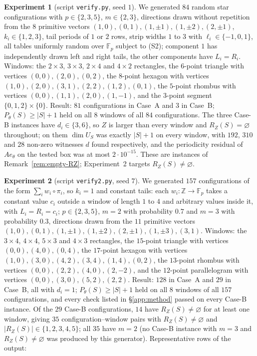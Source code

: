 \documentclass[11pt,reqno]{amsart}
\theoremstyle{plain}
\theoremstyle{definition}
\theoremstyle{remark}
\theoremstyle{plain}
\theoremstyle{remark}
\theoremstyle{definition}
\numberwithin{equation}{section}
\newcommand{\Z}{\mathbb{Z}}
\begin{document}
\noindent\textbf{Experiment 1} (script \texttt{verify.py}, seed $1$).  We
generated $84$ random star configurations with $p\in\{2,3,5\}$, $m\in\{2,3\}$,
directions drawn without
repetition from the $8$ primitive vectors
$(1,0),(0,1),(1,\pm1),(1,\pm2),(2,\pm1)$, $k_i\in\{1,2,3\}$, tail periods of
$1$ or $2$ rows, strip widths $1$ to $3$ with $\ell_i\in\{-1,0,1\}$, all
tables uniformly random over $\mathbb F_p$ subject to \textup{(S2)}; component
$1$ has independently drawn left and right tails, the other components have
$L_i=R_i$.  Windows: the $2\times3$, $3\times3$, $2\times4$ and $4\times2$
rectangles, the $6$-point triangle with vertices $(0,0),(2,0),(0,2)$, the
$8$-point hexagon with vertices $(1,0),(2,0),(3,1),(2,2),(1,2),(0,1)$, the
$5$-point rhombus with vertices $(0,0),(1,1),(2,0),(1,-1)$, and the $3$-point
segment $\{0,1,2\}\times\{0\}$.  Result: $81$ configurations in Case~A and
$3$ in Case~B; $P_\theta(S)\ge|S|+1$ held on all $8$ windows of all $84$
configurations.  The three Case-B instances have $d_i\in\{3,6\}$, so $Z$ is
larger than every window and $R_Z(S)=\varnothing$ throughout; on them
$\dim U_S$ was exactly $|S|+1$ on every window, with $192$, $310$ and $28$
non-zero witnesses $d$ found respectively, and the periodicity residual of
$Ae_\theta$ on the tested box was at most $2\cdot10^{-15}$.  These are instances of
Remark~\ref{rem:empty-RZ}; Experiment~2 targets $R_Z(S)\ne\varnothing$.

\noindent\textbf{Experiment 2} (script \texttt{verify2.py}, seed $7$).  We
generated $157$ configurations of the form $\sum_iw_i\circ\pi_i$, so $k_i=1$
and constant
tails: each $w_i\colon\Z\to\mathbb F_p$ takes a constant value $c_i$ outside a
window of length $1$ to $4$ and arbitrary values inside it, with $L_i=R_i=c_i$;
$p\in\{2,3,5\}$, $m=2$ with probability $0.7$ and $m=3$ with probability
$0.3$, directions drawn from the $11$ primitive vectors
$(1,0),(0,1),(1,\pm1),(1,\pm2),(2,\pm1),(1,\pm3),(3,1)$.  Windows: the
$3\times4$, $4\times4$, $5\times3$ and $4\times3$ rectangles, the $15$-point
triangle with vertices $(0,0),(4,0),(0,4)$, the $17$-point hexagon with
vertices $(1,0),(3,0),(4,2),(3,4),(1,4),(0,2)$, the $13$-point rhombus with
vertices $(0,0),(2,2),(4,0),(2,-2)$, and the $12$-point parallelogram with
vertices $(0,0),(3,0),(5,2),(2,2)$.  Result: $128$ in Case~A and $29$ in
Case~B, all with $d_i=1$; $P_\theta(S)\ge|S|+1$ held on all $8$ windows of all
$157$ configurations, and every check listed in \S\ref{app:method} passed on
every Case-B instance.  Of the $29$ Case-B configurations, $14$ have
$R_Z(S)\ne\varnothing$ for at least one window, giving $35$
configuration--window pairs with $R_Z(S)\ne\varnothing$ and
$|R_Z(S)|\in\{1,2,3,4,5\}$; all $35$ have $m=2$ (no Case-B instance with
$m=3$ and $R_Z(S)\ne\varnothing$ was produced by this generator).
Representative rows of the output:
\end{document}
